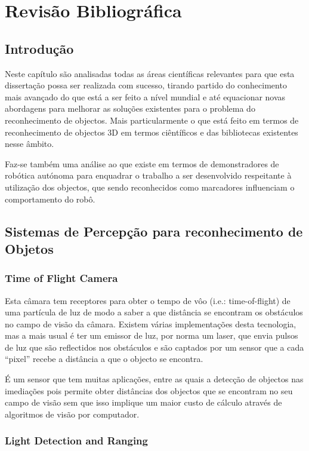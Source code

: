 \chapter{Revisão Bibliográfica} \label{chap:sota}

\section{Introdução}

Neste capítulo são analisadas todas as áreas científicas relevantes
para que esta dissertação possa ser realizada com sucesso, tirando partido do
conhecimento mais avançado do que está a ser feito a nível mundial e até 
equacionar novas abordagens para melhorar as soluções existentes para o problema
do reconhecimento de objectos. Mais particularmente o que está feito em termos de
reconhecimento de objectos 3D em termos ciêntíficos e das bibliotecas existentes
nesse âmbito.

Faz-se também uma análise ao que existe em termos de demonstradores de robótica autónoma
para enquadrar o trabalho a ser desenvolvido respeitante à utilização dos objectos,
que sendo reconhecidos como marcadores influenciam o comportamento do robô.

\section{Sistemas de Percepção para reconhecimento de Objetos}

\subsection{Time of Flight Camera}

Esta câmara tem receptores para obter o tempo de vôo (i.e.: time-of-flight)
de uma partícula de luz de modo a saber a que distância se encontram os
obstáculos no campo de visão da câmara. Existem várias implementações desta
tecnologia, mas a mais usual é ter um emissor de luz, por norma um laser,
que envia pulsos de luz que são reflectidos nos obstáculos e são captados por
um sensor que a cada “pixel” recebe a distância a que o objecto se encontra.

É um sensor que tem muitas aplicações, entre as quais a detecção de objectos nas imediações
pois permite obter distâncias dos objectos que se encontram no seu campo
de visão sem que isso implique um maior custo de cálculo através de algoritmos
de visão por computador. 

\subsection[LIDAR]{Light Detection and Ranging}

